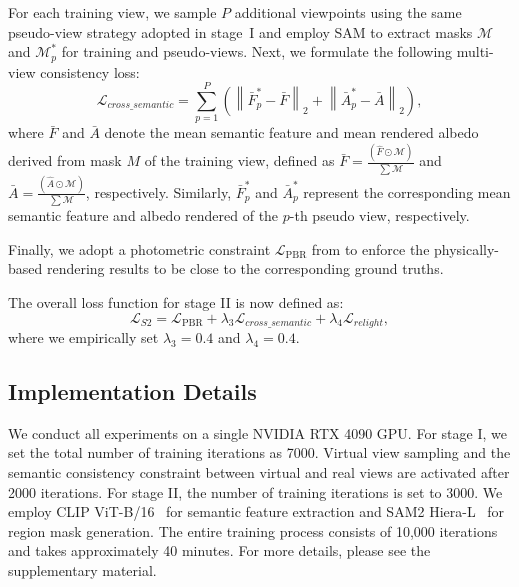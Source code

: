 For each training view, we sample $P$ additional viewpoints using the same pseudo-view strategy adopted in stage~I and employ SAM to extract masks $\mathcal{M}$ and $\mathcal{M}_p^*$ for training and pseudo-views. Next, we formulate the following multi-view consistency loss:
\begin{equation}
\mathcal{L}_{cross\_semantic} = \sum_{p=1}^{P} \left( \left\| \bar{F}_p^* - \bar{F} \right\|_2 + \left\| \bar{A}_p^* - \bar{A} \right\|_2 \right),
\end{equation}
where $\bar{F}$ and $\bar{A}$ denote the mean semantic feature and mean rendered albedo derived from mask $M$ of the training view, defined as $\bar{F} = \frac{(\hat{F} \odot \mathcal{M})}{\sum \mathcal{M}}$ and $\bar{A} = \frac{(\hat{A} \odot \mathcal{M})}{\sum \mathcal{M}}$, respectively. Similarly, $\bar{F}_p^*$ and $\bar{A}_p^*$ represent the corresponding mean semantic feature and albedo rendered of the $p$-th pseudo view, respectively.

Finally, we adopt a photometric constraint $\mathcal{L}_{\text{PBR}}$ from \cite{du2024gs} to enforce the physically-based rendering results to be close to the corresponding ground truths.

The overall loss function for stage II is now defined as:
\begin{equation}
    \mathcal{L}_{S2} = \mathcal{L}_{\text{PBR}} + 
    \lambda_3 \mathcal{L}_{cross\_semantic} +
    \lambda_4 \mathcal{L}_{relight},
\end{equation}
where we empirically set $\lambda_3=0.4$ and $\lambda_4=0.4$.


\subsection{Implementation Details}
We conduct all experiments on a single NVIDIA RTX 4090 GPU. For stage I, we set the total number of training iterations as 7000. Virtual view sampling and the semantic consistency constraint between virtual and real views are activated after 2000 iterations. For stage II, the number of training iterations is set to 3000. We employ CLIP ViT-B/16~\cite{radford2021learning} for semantic feature extraction and SAM2 Hiera-L~\cite{ravi2024sam} for region mask generation. The entire training process consists of 10,000 iterations and takes approximately 40 minutes. For more details, please see the supplementary material.
